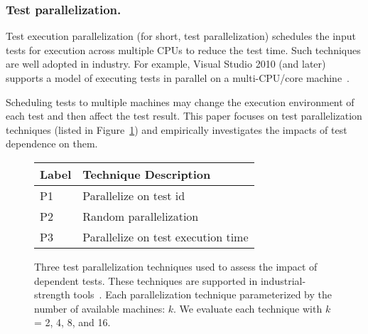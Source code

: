 \subsubsection{Test parallelization.}

Test execution parallelization (for short, test parallelization)
schedules the input tests for execution across
multiple CPUs to reduce the test time.
Such techniques are well adopted in
industry. For example, Visual Studio 2010 (and later)
supports a model of executing tests in parallel on a multi-CPU/core machine~\cite{}.

Scheduling tests to multiple machines may change the execution
environment of each test and then affect the test result.
This paper focuses on \parnum test parallelization techniques
(listed in Figure~\ref{tab:testpar}) and empirically investigates
the impacts of test dependence on them.

\begin{figure}
\centering
\setlength{\tabcolsep}{0.25\tabcolsep}
\begin{tabular}{|l|l|}
\hline
\textbf{Label} & \textbf{Technique Description} \\
\hline
P1 & Parallelize on test id\\
P2 & Random parallelization\\
P3 & Parallelize on test execution time\\
\hline
\end{tabular}
\caption{Three test parallelization techniques used
to assess the impact of dependent tests. These
techniques are supported in industrial-strength
tools~\cite{}. 
Each parallelization technique parameterized
by the number of available machines: $k$. We evaluate
each technique with $k$ = 2, 4, 8, and 16.
}
\label{tab:testpar}
\end{figure}

